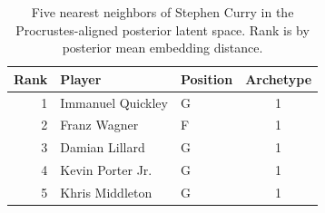 \begin{table}[htbp]
  \centering\small
  \begin{tabular}{rllc}
    \toprule
    Rank & Player & Position & Archetype \\
    \midrule
    1 & Immanuel Quickley & G & 1 \\
    2 & Franz Wagner & F & 1 \\
    3 & Damian Lillard & G & 1 \\
    4 & Kevin Porter Jr. & G & 1 \\
    5 & Khris Middleton & G & 1 \\
    \bottomrule
  \end{tabular}
  \caption{Five nearest neighbors of Stephen Curry in the Procrustes-aligned posterior latent space. Rank is by posterior mean embedding distance.}
  \label{tab:Stephen_Curry_neighbors}
\end{table}

